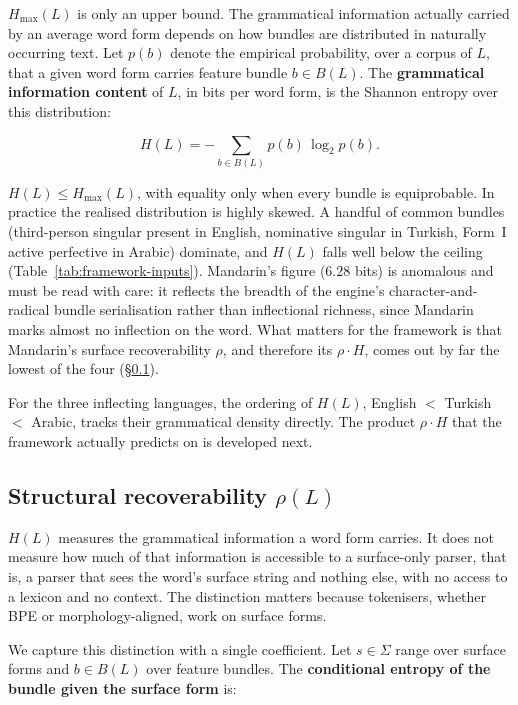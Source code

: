 $H_{\max}(L)$ is only an upper bound. The grammatical information actually carried by an average word form depends on how bundles are distributed in naturally occurring text. Let $p(b)$ denote the empirical probability, over a corpus of $L$, that a given word form carries feature bundle $b \in B(L)$. The \textbf{grammatical information content} of $L$, in bits per word form, is the Shannon entropy over this distribution:

\begin{equation}
H(L) = -\sum_{b \in B(L)} p(b) \, \log_2 p(b).
\label{eq:H}
\end{equation}

$H(L) \le H_{\max}(L)$, with equality only when every bundle is equiprobable. In practice the realised distribution is highly skewed. A handful of common bundles (third-person singular present in English, nominative singular in Turkish, Form~I active perfective in Arabic) dominate, and $H(L)$ falls well below the ceiling (Table~\ref{tab:framework-inputs}). Mandarin's figure ($6.28$ bits) is anomalous and must be read with care: it reflects the breadth of the engine's character-and-radical bundle serialisation rather than inflectional richness, since Mandarin marks almost no inflection on the word. What matters for the framework is that Mandarin's surface recoverability $\rho$, and therefore its $\rho \cdot H$, comes out by far the lowest of the four (\S\ref{sec:framework-rho}).

For the three inflecting languages, the ordering of $H(L)$, English $<$ Turkish $<$ Arabic, tracks their grammatical density directly. The product $\rho \cdot H$ that the framework actually predicts on is developed next.

\subsection{Structural recoverability $\rho(L)$}
\label{sec:framework-rho}

$H(L)$ measures the grammatical information a word form carries. It does not measure how much of that information is accessible to a surface-only parser, that is, a parser that sees the word's surface string and nothing else, with no access to a lexicon and no context. The distinction matters because tokenisers, whether BPE or morphology-aligned, work on surface forms.

We capture this distinction with a single coefficient. Let $s \in \Sigma$ range over surface forms and $b \in B(L)$ over feature bundles. The \textbf{conditional entropy of the bundle given the surface form} is:

